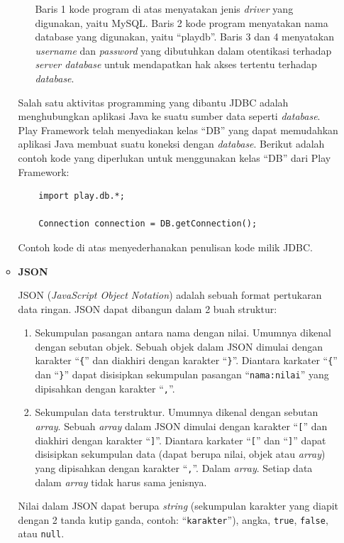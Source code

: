 \documentclass[a4paper,twoside]{article}
\begin{document}
\begin{enumerate}
\begin{itemize}
\begin{enumerate}
	Baris 1 kode program di atas menyatakan jenis \textit{driver} yang digunakan, yaitu MySQL. Baris 2 kode program menyatakan nama database yang digunakan, yaitu ``playdb''. Baris 3 dan 4 menyatakan \textit{username} dan \textit{password} yang dibutuhkan dalam otentikasi terhadap \textit{server database} untuk mendapatkan hak akses tertentu terhadap \textit{database}.
\end{enumerate}

	Salah satu aktivitas programming yang dibantu JDBC adalah menghubungkan aplikasi Java ke suatu sumber data seperti \textit{database}. Play Framework telah menyediakan kelas ``DB'' yang dapat memudahkan aplikasi Java membuat suatu koneksi dengan \textit{database}. Berikut adalah contoh kode yang diperlukan untuk menggunakan kelas ``DB'' dari Play Framework:
	\begin{lstlisting}
	import play.db.*;

	Connection connection = DB.getConnection();
	\end{lstlisting}
	Contoh kode di atas menyederhanakan penulisan kode milik JDBC. 
	
\item \textbf{JSON}

JSON (\textit{JavaScript Object Notation}) adalah sebuah format pertukaran data ringan\cite{json}. JSON dapat dibangun dalam 2 buah struktur:
\begin{enumerate}
	\item Sekumpulan pasangan antara nama dengan nilai. Umumnya dikenal dengan sebutan objek. Sebuah objek dalam JSON dimulai dengan karakter ``\texttt{\{}'' dan diakhiri dengan karakter ``\texttt{\}}''. Diantara karkater ``\texttt{\{}'' dan ``\texttt{\}}'' dapat disisipkan sekumpulan pasangan ``\texttt{nama:nilai}'' yang dipisahkan dengan karakter ``\texttt{,}''.
	\item Sekumpulan data terstruktur. Umumnya dikenal dengan sebutan \textit{array}. Sebuah \textit{array} dalam JSON dimulai dengan karakter ``\texttt{[}'' dan diakhiri dengan karakter ``\texttt{]}''. Diantara karkater ``\texttt{[}'' dan ``\texttt{]}'' dapat disisipkan sekumpulan data (dapat berupa nilai, objek atau \textit{array}) yang dipisahkan dengan karakter ``\texttt{,}''. Dalam \textit{array}. Setiap data dalam \textit{array} tidak harus sama jenisnya.
\end{enumerate}

Nilai dalam JSON dapat berupa \textit{string} (sekumpulan karakter yang diapit dengan 2 tanda kutip ganda, contoh: ``\texttt{karakter}''), angka, \texttt{true}, \texttt{false}, atau \texttt{null}.


\end{itemize}
\end{enumerate}
\end{document}

